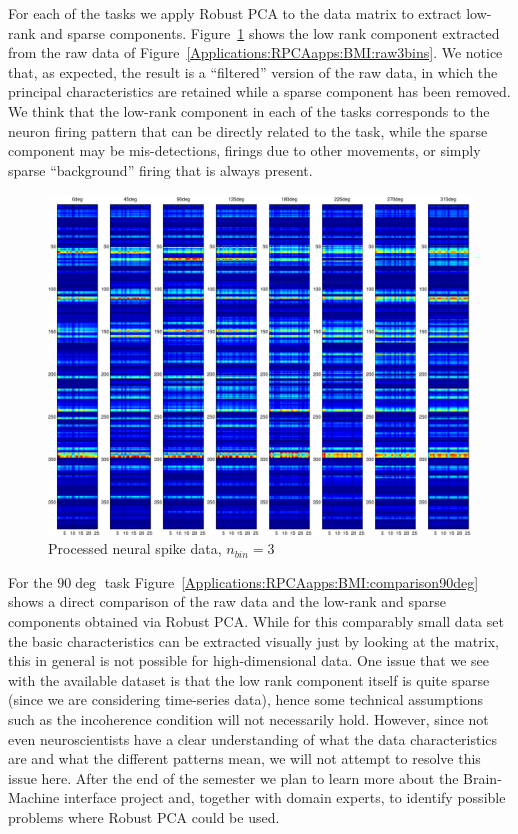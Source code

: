 For each of the tasks we apply Robust PCA to the data matrix to extract low-rank and sparse components. Figure~\ref{Applications:RPCAapps:BMI:processed3bins} shows the low rank component extracted from the raw data of Figure~\ref{Applications:RPCAapps:BMI:raw3bins}. We notice that, as expected, the result is a ``filtered'' version of the raw data, in which the principal characteristics are retained while a sparse component has been removed. We think that the low-rank component in each of the tasks corresponds to the neuron firing pattern that can be directly related to the task, while the sparse component may be mis-detections, firings due to other movements, or simply sparse ``background'' firing that is always present.

%
\begin{figure}[h]
\centering
\includegraphics[width=\textwidth]{../figures/BMI_processed_3bins}
\caption{Processed neural spike data, $n_{bin}=3$}
\label{Applications:RPCAapps:BMI:processed3bins}
\end{figure}
%
For the $90\deg$ task Figure~\ref{Applications:RPCAapps:BMI:comparison90deg} shows a direct comparison of the raw data and the low-rank and sparse components obtained via Robust PCA. While for this comparably small data set the basic characteristics can be extracted visually just by looking at the matrix, this in general is not possible for high-dimensional data. One issue that we see with the available dataset is that the low rank component itself is quite sparse (since we are considering time-series data), hence some technical assumptions such as the incoherence condition will not necessarily hold. However, since not even neuroscientists have a clear understanding of what the data characteristics are and what the different patterns mean, we will not attempt to resolve this issue here. After the end of the semester we plan to learn more about the Brain-Machine interface project and, together with domain experts, to identify possible problems where Robust PCA could be used.


